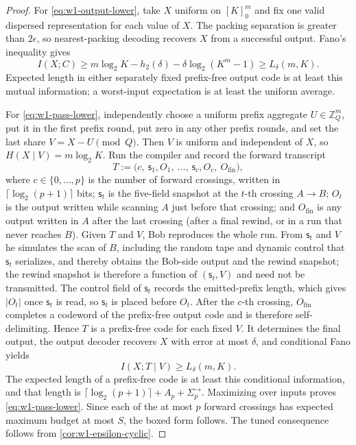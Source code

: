 \begin{proof}
For \eqref{eq:w1-output-lower}, take $X$ uniform on $[K]_0^m$ and fix one
valid dispersed representation for each value of $X$.
The packing separation is greater than $2\epsilon$, so nearest-packing
decoding recovers $X$ from a successful output.  Fano's inequality gives
\begin{equation*}
 I(X;C)\geq m\log_2K-h_2(\delta)
 -\delta\log_2(K^m-1)\geq L_\delta(m,K).
\end{equation*}
Expected length in either separately fixed prefix-free output code is at
least this mutual information; a worst-input expectation is at least the
uniform average.

For \eqref{eq:w1-pass-lower}, independently choose a uniform prefix
aggregate $U\in\mathbb Z_Q^m$, put it in the first prefix round, put zero
in any other prefix rounds, and set the last share $V=X-U\pmod Q$.
Then $V$ is uniform and independent of $X$, so
$H(X\mid V)=m\log_2K$.  Run the compiler and record the forward
transcript
\begin{equation*}
 T:=\bigl(c,\ \mathsf s_1,O_1,\ \ldots,\ \mathsf s_c,O_c,\ O_{\mathrm{fin}}\bigr),
\end{equation*}
where $c\in\{0,\ldots,p\}$ is the number of forward crossings, written in
$\lceil\log_2(p+1)\rceil$ bits; $\mathsf s_t$ is the five-field snapshot at the
$t$-th crossing $A\to B$; $O_t$ is the output written while scanning $A$
just before that crossing; and $O_{\mathrm{fin}}$ is any output written in
$A$ after the last crossing (after a final rewind, or in a run that never
reaches $B$).  Given $T$ and $V$, Bob reproduces the whole run.
From $\mathsf s_t$ and $V$ he simulates the scan of $B$, including the random
tape and dynamic control that $\mathsf s_t$ serializes, and thereby obtains the
Bob-side output and the rewind snapshot; the rewind snapshot is therefore a
function of $(\mathsf s_t,V)$ and need not be transmitted.  The control field
of $\mathsf s_t$ records the emitted-prefix length, which gives $|O_t|$ once
$\mathsf s_t$ is read, so $\mathsf s_t$ is placed before $O_t$.  After the $c$-th
crossing, $O_{\mathrm{fin}}$ completes a codeword of the prefix-free output
code and is therefore self-delimiting.  Hence $T$ is a prefix-free code for
each fixed $V$.  It determines the final output, the output decoder recovers
$X$ with error at most $\delta$, and conditional Fano yields
\begin{equation*}
 I(X;T\mid V)\geq L_\delta(m,K).
\end{equation*}
The expected length of a prefix-free code is at least this conditional
information, and that length is
$\lceil\log_2(p+1)\rceil+A_p+\Sigma^{\to}_p$.  Maximizing over inputs proves
\eqref{eq:w1-pass-lower}.  Since each of the at most $p$ forward crossings
has expected maximum budget at most $S$, the boxed form follows.  The tuned
consequence follows from \cref{cor:w1-epsilon-cyclic}.
\end{proof}

